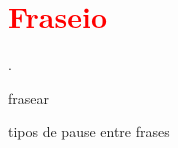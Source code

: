 \section{\textcolor{red}{Fraseio}}



\cite[pp. 48]{howard1991aprendendo}
\cite[pp. 348]{stainer2009dictionary}
\cite[pp. 624]{latham2008diccionario}.
\cite[pp. 257]{medteoria}
\cite[pp. 15-19]{holst1998abc}
\cite[pp. 668]{apel1969harvard}

frasear \cite[pp. 336]{medteoria}

tipos de pause entre frases \cite[pp. 252]{medteoria}
